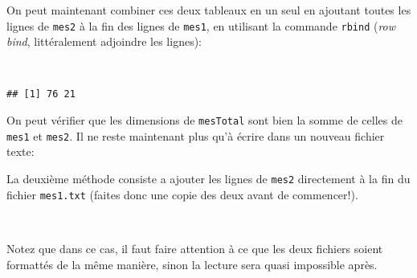On peut maintenant combiner ces deux tableaux en un seul en ajoutant toutes les lignes de \texttt{mes2} à la fin des lignes de \texttt{mes1}, en utilisant la commande \texttt{rbind} (\emph{row bind}, littéralement adjoindre les lignes):

\begin{knitrout}
\color{fgcolor}\begin{kframe}
\begin{flushleft}
\ttfamily\noindent
{}\hlassignement{\usebox{\hlnormalsizeboxlessthan}-}{\ }\hlkeyword{(}\hlkeyword{,}{\ }\hlkeyword{)}\hspace*{\fill}\\
\hlstd{}\hlkeyword{(}\hlkeyword{)}\mbox{}
\normalfont
\end{flushleft}
\begin{verbatim}
## [1] 76 21
\end{verbatim}
\end{kframe}
\end{knitrout}


On peut vérifier que les dimensions de \texttt{mesTotal} sont bien la somme de celles de \texttt{mes1} et \texttt{mes2}.
Il ne reste maintenant plus qu'à écrire dans un nouveau fichier texte:

\begin{knitrout}
\color{fgcolor}\begin{kframe}
\begin{flushleft}
\ttfamily\noindent
{}\hlkeyword{(}\hlkeyword{,}{\ }\hlargument{=}{\ }\hlkeyword{,}{\ }\hlargument{=}{\ }\hlkeyword{,}{\ }\hlargument{=}{\ }\hlkeyword{)}\mbox{}
\normalfont
\end{flushleft}
\end{kframe}
\end{knitrout}


La deuxième méthode consiste a ajouter les lignes de \texttt{mes2} directement à la fin du fichier \texttt{mes1.txt} (faites donc une copie des deux avant de commencer!).

\begin{knitrout}
\color{fgcolor}\begin{kframe}
\begin{flushleft}
\ttfamily\noindent
{}\hlkeyword{(}\hlkeyword{,}{\ }\hlargument{=}{\ }\hlkeyword{,}{\ }\hlargument{=}{\ }\hlkeyword{,}{\ }\hlargument{=}{\ }\hlkeyword{,}\hspace*{\fill}\\
\hlstd{}{\ }{\ }{\ }{\ }\hlargument{=}{\ }\hlkeyword{)}\mbox{}
\normalfont
\end{flushleft}
\end{kframe}
\end{knitrout}


Notez que dans ce cas, il faut faire attention à ce que les deux fichiers soient formattés de la même manière, sinon la lecture sera quasi impossible après.

